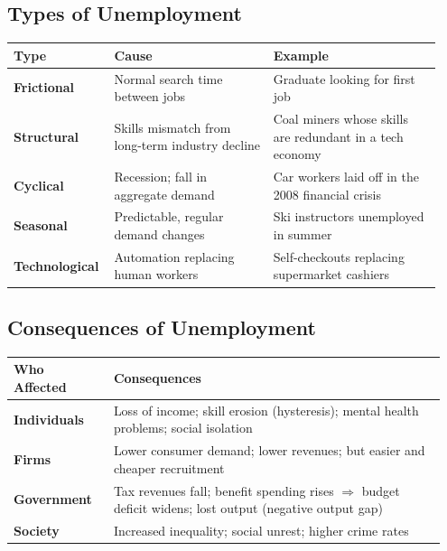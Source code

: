 \documentclass[11pt, a4paper, twoside]{book}
\begin{document}
\subsection{Types of Unemployment}

\begin{tcolorbox}[enhanced,colback=LightBlue,colframe=MidBlue!70,arc=0pt,boxrule=0.8pt]
\begin{tabular}{@{}>{\RaggedRight\arraybackslash}p{0.20\linewidth}>{\RaggedRight\arraybackslash}p{0.36\linewidth}>{\RaggedRight\arraybackslash}p{0.38\linewidth}@{}}
\textbf{\color{NavyPrimary}Type} & \textbf{\color{NavyPrimary}Cause} & \textbf{\color{NavyPrimary}Example} \\
\midrule
\textbf{Frictional} & Normal search time between jobs & Graduate looking for first job \\
\textbf{Structural} & Skills mismatch from long-term industry decline & Coal miners whose skills are redundant in a tech economy \\
\textbf{Cyclical} & Recession; fall in aggregate demand & Car workers laid off in the 2008 financial crisis \\
\textbf{Seasonal} & Predictable, regular demand changes & Ski instructors unemployed in summer \\
\textbf{Technological} & Automation replacing human workers & Self-checkouts replacing supermarket cashiers \\
\end{tabular}
\end{tcolorbox}

\subsection{Consequences of Unemployment}

\begin{tcolorbox}[enhanced,colback=LightBlue,colframe=MidBlue!70,arc=0pt,boxrule=0.8pt]
\begin{tabular}{@{}>{\RaggedRight\arraybackslash}p{0.22\linewidth}>{\RaggedRight\arraybackslash}p{0.73\linewidth}@{}}
\textbf{\color{NavyPrimary}Who Affected} & \textbf{\color{NavyPrimary}Consequences} \\
\midrule
\textbf{Individuals} & Loss of income; skill erosion (hysteresis); mental health problems; social isolation \\
\textbf{Firms} & Lower consumer demand; lower revenues; but easier and cheaper recruitment \\
\textbf{Government} & Tax revenues fall; benefit spending rises $\Rightarrow$ budget deficit widens; lost output (negative output gap) \\
\textbf{Society} & Increased inequality; social unrest; higher crime rates \\
\end{tabular}
\end{tcolorbox}
\end{document}
